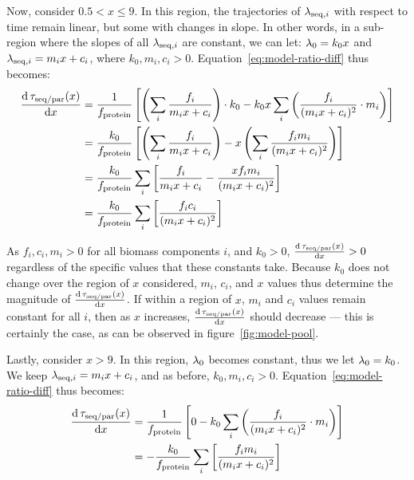 Now, consider $0.5 < x \leq 9$.
In this region, the trajectories of $\lambda_{\mathrm{seq},i}$ with respect to time remain linear, but some with changes in slope.
In other words, in a sub-region where the slopes of all $\lambda_{\mathrm{seq},i}$ are constant, we can let: $\lambda_{0} = k_{0}x$ and $\lambda_{\mathrm{seq},i} = m_{i}x + c_{i}$, where $k_{0}, m_{i}, c_{i} > 0$.
Equation~\ref{eq:model-ratio-diff} thus becomes:
\begin{equation}
  \begin{aligned}
  \frac{\mathrm{d} \, \tau_{\mathrm{seq}/\mathrm{par}}(x)}{\mathrm{d} x} &= \frac{1}{f_{\mathrm{protein}}} \left[ \left( \sum_i \frac{f_i}{m_{i}x+c_{i}} \right) \cdot k_{0} - k_{0}x \sum_{i}\left( \frac{f_{i}}{(m_{i}x+c_{i})^{2}} \cdot m_{i} \right) \right]\\
  &= \frac{k_{0}}{f_{\mathrm{protein}}} \left[ \left( \sum_i \frac{f_i}{m_{i}x+c_{i}} \right) - x \left( \sum_{i} \frac{f_{i}m_{i}}{(m_{i}x+c_{i})^{2}} \right) \right]\\
  &= \frac{k_{0}}{f_{\mathrm{protein}}} \sum_{i} \left[ \frac{f_i}{m_{i}x+c_{i}} - \frac{xf_{i}m_{i}}{(m_{i}x+c_{i})^{2}} \right]\\
  &= \frac{k_{0}}{f_{\mathrm{protein}}} \sum_{i} \left[ \frac{f_{i}c_{i}}{(m_{i}x+c_{i})^{2}} \right]
  \end{aligned}
  \label{eq:model-ratio-diff-midx}
\end{equation}

As $f_{i}, c_{i}, m_{i} > 0$ for all biomass components $i$, and $k_{0} > 0$, $\frac{\mathrm{d} \, \tau_{\mathrm{seq}/\mathrm{par}}(x)}{\mathrm{d} x} > 0$ regardless of the specific values that these constants take.
Because $k_{0}$ does not change over the region of $x$ considered, $m_{i}$, $c_{i}$, and $x$ values thus determine the magnitude of $\frac{\mathrm{d} \, \tau_{\mathrm{seq}/\mathrm{par}}(x)}{\mathrm{d} x}$.
If within a region of $x$, $m_{i}$ and $c_{i}$ values remain constant for all $i$, then as $x$ increases, $\frac{\mathrm{d} \, \tau_{\mathrm{seq}/\mathrm{par}}(x)}{\mathrm{d} x}$ should decrease --- this is certainly the case, as can be observed in figure~\ref{fig:model-pool}.

Lastly, consider $x > 9$.
In this region, $\lambda_{0}$ becomes constant, thus we let $\lambda_{0} = k_{0}$.
We keep $\lambda_{\mathrm{seq},i} = m_{i}x + c_{i}$, and as before, $k_{0}, m_{i}, c_{i} > 0$.
Equation~\ref{eq:model-ratio-diff} thus becomes:
\begin{equation}
  \begin{aligned}
  \frac{\mathrm{d} \, \tau_{\mathrm{seq}/\mathrm{par}}(x)}{\mathrm{d} x} &= \frac{1}{f_{\mathrm{protein}}} \left[ 0 - k_{0} \sum_{i}\left( \frac{f_{i}}{(m_{i}x+c_{i})^{2}} \cdot m_{i} \right) \right]\\
  &= -\frac{k_{0}}{f_{\mathrm{protein}}} \sum_{i}\left[ \frac{f_{i}m_{i}}{(m_{i}x+c_{i})^{2}} \right]
  \end{aligned}
  \label{eq:model-ratio-diff-largex}
\end{equation}

